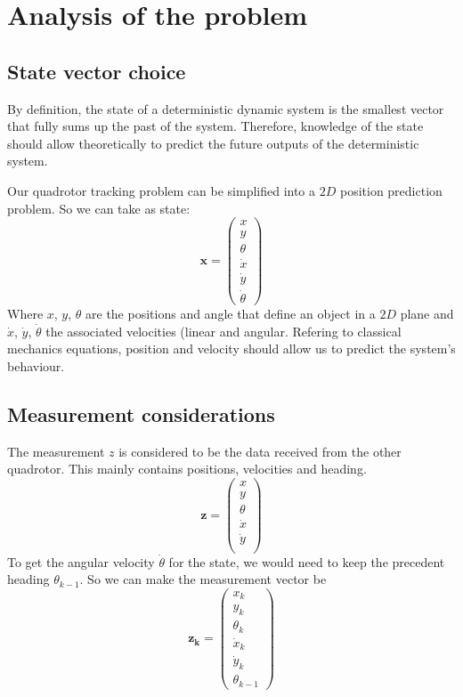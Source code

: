 \documentclass[12pt]{article}
\begin{document}
\section{Analysis of the problem}

\subsection{State vector choice}
By definition, the state of a deterministic dynamic system is the smallest vector that fully sums up the past of the system.
Therefore, knowledge of the state should allow theoretically to predict the future outputs of the deterministic system.

Our quadrotor tracking problem can be simplified into a $2D$ position prediction problem.
So we can take as state:
\begin{equation}
\mathbf{x} =
    \begin{pmatrix}
        x\\
        y\\
        \theta\\
        \dot{x}\\
        \dot{y}\\
        \dot{\theta}
    \end{pmatrix}
\end{equation}
Where $x$, $y$, $\theta$ are the positions and angle that define an object in a $2D$ plane and $\dot{x}$, $\dot{y}$, $\dot{\theta}$ the associated velocities (linear and angular.
Refering to classical mechanics equations, position and velocity should allow us to predict the system's behaviour.

\subsection{Measurement considerations}
The measurement $z$ is considered to be the data received from the other quadrotor. This mainly contains positions, velocities and heading.
\begin{equation}
\mathbf{z} =
    \begin{pmatrix}
        x\\
        y\\
        \theta\\
        \dot{x}\\
        \dot{y}\\
    \end{pmatrix}
\end{equation}
To get the angular velocity $\dot{\theta}$ for the state, we would need to keep the precedent heading $\theta_{k-1}$.
So we can make the measurement vector be
\begin{equation}
\mathbf{z_k} =
    \begin{pmatrix}
        x_k\\
        y_k\\
        \theta_k\\
        \dot{x}_k\\
        \dot{y}_k\\
        \theta_{k-1}
    \end{pmatrix}
\end{equation}
\end{document}

